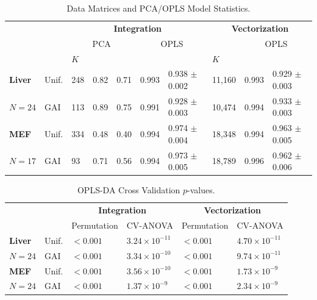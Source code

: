\begin{table}[h!]
\caption{Data Matrices and PCA/OPLS Model Statistics.}
\begin{center}
\begin{tabular}{l l | l l l l l | l l l}
  \hline
              &         &
    \multicolumn{5}{c|}{{\bf Integration}} &
    \multicolumn{3}{c}{{\bf Vectorization}} \\
              &         &
    \multicolumn{3}{c}{PCA} &
    \multicolumn{2}{c|}{OPLS} & &
    \multicolumn{2}{c}{OPLS} \\
  \hline
              &         &
    $K$       & \rsqx{} & \qsq{} & \rsqy{} & \qsq{} &
    $K$                          & \rsqy{} & \qsq{} \\
  \hline
  {\bf Liver} & Unif.   &
    248       & 0.82    & 0.71   & 0.993   & 0.938 $\pm$ 0.002 &
    11,160                       & 0.993   & 0.929 $\pm$ 0.003 \\
  $N = 24$    & GAI     &
    113       & 0.89    & 0.75   & 0.991   & 0.928 $\pm$ 0.003 &
    10,474                       & 0.994   & 0.933 $\pm$ 0.003 \\
  \hline
  {\bf MEF}   & Unif.   &
    334       & 0.48    & 0.40   & 0.994   & 0.974 $\pm$ 0.004 &
    18,348                       & 0.994   & 0.963 $\pm$ 0.005 \\
  $N = 17$    & GAI     &
    93        & 0.71    & 0.56   & 0.994   & 0.973 $\pm$ 0.005 &
    18,789                       & 0.996   & 0.962 $\pm$ 0.006
\end{tabular}
\end{center}
\end{table}

\begin{table}[h!]
\caption{OPLS-DA Cross Validation $p$-values.}
\begin{center}
\begin{tabular}{l l | l l | l l}
  \hline
              &       &
    \multicolumn{2}{c|}{{\bf Integration}} &
    \multicolumn{2}{c}{{\bf Vectorization}} \\
              &       & Permutation & CV-ANOVA & Permutation & CV-ANOVA \\
  \hline
  {\bf Liver} & Unif. &
    $< 0.001$ & $3.24 \times 10^{-11}$ & $< 0.001$ & $4.70 \times 10^{-11}$ \\
  $N = 24$    & GAI   &
    $< 0.001$ & $3.34 \times 10^{-10}$ & $< 0.001$ & $9.74 \times 10^{-11}$ \\
  \hline
  {\bf MEF}   & Unif. &
    $< 0.001$ & $3.56 \times 10^{-10}$ & $< 0.001$ & $1.73 \times 10^{-9}$ \\
  $N = 24$    & GAI   &
    $< 0.001$ & $1.37 \times 10^{-9}$  & $< 0.001$ & $2.34 \times 10^{-9}$
\end{tabular}
\end{center}
\end{table}

